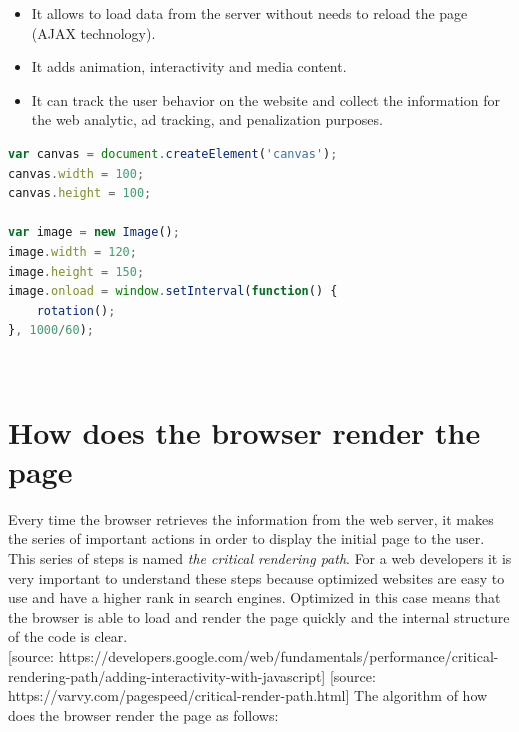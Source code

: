 \begin{itemize}
    \item It allows to load data from the server without needs to reload the page (AJAX technology).
    \item It adds animation, interactivity and media content.
    \item It can track the user behavior on the website and collect the information for the web analytic, ad tracking, and penalization purposes.
\end{itemize}

\begin{lstlisting}[language=JavaScript, caption={Small example of JavaScript code}, label={lst:js}, captionpos=b]
var canvas = document.createElement('canvas');
canvas.width = 100;
canvas.height = 100;

var image = new Image();
image.width = 120;
image.height = 150;
image.onload = window.setInterval(function() {
    rotation();
}, 1000/60);
\end{lstlisting}\\


\section{How does the browser render the page}
\label{sec:browser}

Every time the browser retrieves the information from the web server, it makes the series of important actions in order to display the initial page to the user. This series of steps is named \textit{the critical rendering path}. For a web developers it is very important to understand these steps because optimized websites are easy to use and have a higher rank in search engines. Optimized in this case means that the browser is able to load and render the page quickly and the internal structure of the code is clear.\\

[source: https://developers.google.com/web/fundamentals/performance/critical-rendering-path/adding-interactivity-with-javascript]
[source: https://varvy.com/pagespeed/critical-render-path.html]
The algorithm of how does the browser render the page as follows:

